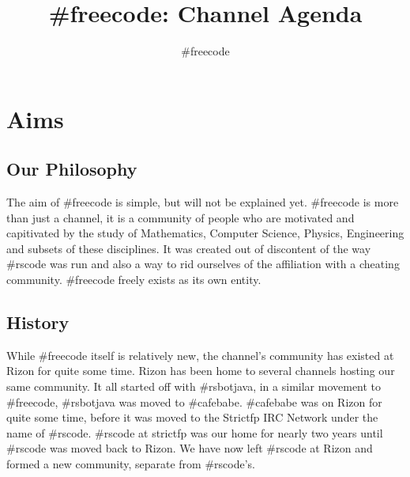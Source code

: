 \documentclass[a4paper]{article}
\title{\#freecode: Channel Agenda}
\author{\#freecode}
\begin{document}
\maketitle

\section{Aims}
\subsection{Our Philosophy}
The aim of \#freecode is simple, but will not be explained yet.
\#freecode is more than just a channel, it is a community of people who are motivated and capitivated by the study of Mathematics, Computer Science, Physics, Engineering and subsets of these disciplines. It was created out of  discontent of the way \#rscode was run and also a way to rid ourselves of the affiliation with a cheating community.
\#freecode freely exists as its own entity.

\subsection{History}
While \#freecode itself is relatively new, the channel's community has existed at Rizon for quite some time.
Rizon has been home to several channels hosting our same community.
It all started off with \#rsbotjava, in a similar movement to \#freecode, \#rsbotjava was moved to \#cafebabe.
\#cafebabe was on Rizon for quite some time, before it was moved to the Strictfp IRC Network under the name of \#rscode.
\#rscode at strictfp was our home for nearly two years until \#rscode was moved back to Rizon.
We have now left \#rscode at Rizon and formed a new community, separate from \#rscode's.
\end{document}
